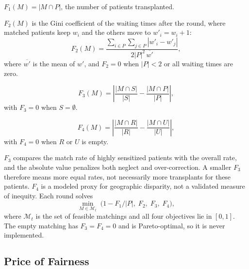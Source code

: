 \documentclass[journal]{IEEEtran}
\begin{document}
\begin{definition}
$F_1(M) = |M \cap P|$, the number of patients transplanted.
\end{definition}

\begin{definition}
$F_2(M)$ is the Gini coefficient of the waiting times after the round,
where matched patients keep $w_i$ and the others move to
$w'_i = w_i + 1$:
\begin{equation}
  F_2(M) = \frac{\sum_{i \in P}\sum_{j \in P} |w'_i - w'_j|}
                {2 |P|^2 \, \overline{w'}} ,
  \label{eq:gini}
\end{equation}
where $\overline{w'}$ is the mean of $w'$, and $F_2 = 0$ when $|P| < 2$
or all waiting times are zero.
\end{definition}

\begin{definition}
\begin{equation}
  F_3(M) = \left| \frac{|M \cap S|}{|S|} - \frac{|M \cap P|}{|P|}
  \right| ,
  \label{eq:f3}
\end{equation}
with $F_3 = 0$ when $S = \emptyset$.
\end{definition}

\begin{definition}
\begin{equation}
  F_4(M) = \left| \frac{|M \cap R|}{|R|} - \frac{|M \cap U|}{|U|}
  \right| ,
  \label{eq:f4}
\end{equation}
with $F_4 = 0$ when $R$ or $U$ is empty.
\end{definition}

$F_3$ compares the match rate of highly sensitized patients with the
overall rate, and the absolute value penalizes both neglect and
over-correction. A smaller $F_3$ therefore means more equal rates, not
necessarily more transplants for these patients. $F_4$ is a modeled
proxy for geographic disparity, not a validated measure of inequity.
Each round solves
\begin{equation}
  \min_{M \in \mathcal{M}_t} \;
  \bigl( 1 - F_1/|P|,\; F_2,\; F_3,\; F_4 \bigr) ,
  \label{eq:mop}
\end{equation}
where $\mathcal{M}_t$ is the set of feasible matchings and all four
objectives lie in $[0, 1]$. The empty matching has $F_3 = F_4 = 0$ and
is Pareto-optimal, so it is never implemented.

\subsection{Price of Fairness}
\label{sec:problem:pof}
\end{document}
